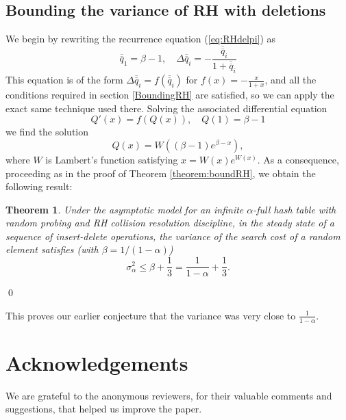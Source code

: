\documentclass[proceedings]{aofa}
\newtheorem{theorem}{Theorem}
\newcommand{\tail}[1]{\overline{#1}}
\newcommand{\ttail}[1]{\tail{\tail{#1}}}
\begin{document}
\subsection{Bounding the variance of RH with deletions}
We begin by rewriting the recurrence equation (\ref{eq:RHdelpi}) as
\begin{equation}\label{eq:recurqwdel}
\ttail{q}_1=\beta-1, \quad \Delta \ttail{q}_i = -\frac{\ttail{q}_i}{1+\ttail{q}_i}
\end{equation}
This equation is of the form $\Delta \ttail{q}_i = f(\ttail{q}_i)$ for $f(x)=-\frac{x}{1+x}$,
and all the conditions required in section \ref{BoundingRH} are satisfied, so we can apply the exact same technique
used there.
Solving the associated differential equation 
\begin{equation}\label{eq:diffQwdel}
Q'(x) = f(Q(x)), \quad Q(1)=\beta-1
\end{equation}
we find the solution
\begin{equation}
Q(x) = W((\beta-1)e^{\beta-x}),
\end{equation}
where $W$ is Lambert's function satisfying $x=W(x)e^{W(x)}$.
As a consequence,
proceeding as in the proof of Theorem \ref{theorem:boundRH},
we obtain the following result:
\begin{theorem}\label{theorem:boundRHwdel}
Under the asymptotic model for an infinite $\alpha$-full hash table with random
probing and RH collision resolution discipline, 
in the steady state of a sequence of insert-delete operations, the variance of the search 
cost of a random element satisfies
(with $\beta = 1/(1-\alpha)$)
\begin{equation}\label{eq:boundvar1}
\sigma^2_{\alpha} \le
\beta+\frac{1}{3}=\frac{1}{1-\alpha}+\frac{1}{3}.
\end{equation}
\end{theorem}
\qed

This proves our earlier conjecture that the variance was very close to $\frac{1}{1-\alpha}$.

\section{Acknowledgements}
We are grateful to the anonymous reviewers, for their valuable comments and suggestions, that helped us improve the paper.


\end{document}
